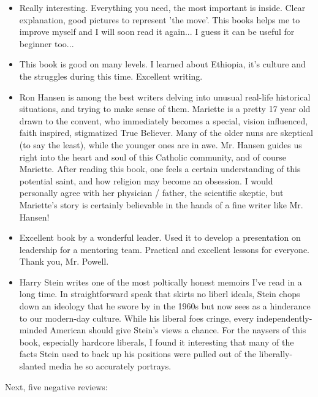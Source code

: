 \begin{itemize}
    \item Really interesting. Everything you need, the most important is inside. Clear explanation, good pictures to represent ’the move’. This books helps me to improve
myself and I will soon read it again... I guess it can be useful for beginner too...
    \item This book is good on many levels. I learned about Ethiopia, it’s culture and the
struggles during this time. Excellent writing.

    \item Ron Hansen is among the best writers delving into unusual real-life historical situations, and trying to make sense of them. Mariette is a pretty 17 year old drawn
to the convent, who immediately becomes a special, vision influenced, faith inspired, stigmatized True Believer. Many of the older nuns are skeptical (to say the least), while the younger ones are in awe. Mr. Hansen guides us right into the
heart and soul of this Catholic community, and of course Mariette. After reading this book, one feels a certain understanding of this potential saint, and how
religion may become an obsession. I would personally agree with her physician
/ father, the scientific skeptic, but Mariette’s story is certainly believable in the
hands of a fine writer like Mr. Hansen!

    \item Excellent book by a wonderful leader. Used it to develop a presentation on leadership for a mentoring team. Practical and excellent lessons for everyone. Thank
you, Mr. Powell.

    \item Harry Stein writes one of the most poltically honest memoirs I’ve read in a long
time. In straightforward speak that skirts no liberl ideals, Stein chops down an
ideology that he swore by in the 1960s but now sees as a hinderance to our
modern-day culture. While his liberal foes cringe, every independently-minded
American should give Stein’s views a chance. For the naysers of this book, especially hardcore liberals, I found it interesting that many of the facts Stein used to
back up his positions were pulled out of the liberally-slanted media he so accurately portrays.
\end{itemize}

Next, five negative reviews:

